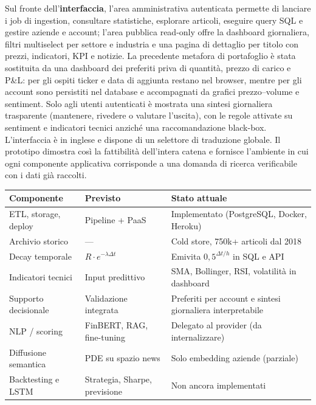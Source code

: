 \documentclass[a4paper,11pt]{article}
\begin{document}
Sul fronte dell'\textbf{interfaccia}, l'area amministrativa autenticata permette di lanciare i job di ingestion, consultare statistiche, esplorare articoli, eseguire query SQL e gestire aziende e account; l'area pubblica read-only offre la dashboard giornaliera, filtri multiselect per settore e industria e una pagina di dettaglio per titolo con prezzi, indicatori, KPI e notizie. La precedente metafora di portafoglio è stata sostituita da una dashboard dei preferiti priva di quantità, prezzo di carico e P\&L: per gli ospiti ticker e data di aggiunta restano nel browser, mentre per gli account sono persistiti nel database e accompagnati da grafici prezzo--volume e sentiment. Solo agli utenti autenticati è mostrata una sintesi giornaliera trasparente (mantenere, rivedere o valutare l'uscita), con le regole attivate su sentiment e indicatori tecnici anziché una raccomandazione black-box. L'interfaccia è in inglese e dispone di un selettore di traduzione globale. Il prototipo dimostra così la fattibilità dell'intera catena e fornisce l'ambiente in cui ogni componente applicativa corrisponde a una domanda di ricerca verificabile con i dati già raccolti.

\begin{table}[H]
\centering
\renewcommand{\arraystretch}{1.2}
\small
\begin{tabular}{|p{4.6cm}|p{3.4cm}|p{5.6cm}|}
\hline
\textbf{Componente} & \textbf{Previsto} & \textbf{Stato attuale} \\
\hline
ETL, storage, deploy & Pipeline + PaaS & Implementato (PostgreSQL, Docker, Heroku) \\
\hline
Archivio storico & --- & Cold store, 750k+ articoli dal 2018 \\
\hline
Decay temporale & $R\cdot e^{-\lambda\Delta t}$ & Emivita $0{,}5^{\Delta t/h}$ in SQL e API \\
\hline
Indicatori tecnici & Input predittivo & SMA, Bollinger, RSI, volatilità in dashboard \\
\hline
Supporto decisionale & Validazione integrata & Preferiti per account e sintesi giornaliera interpretabile \\
\hline
NLP / scoring & FinBERT, RAG, fine-tuning & Delegato al provider (da internalizzare) \\
\hline
Diffusione semantica & PDE su spazio news & Solo embedding aziende (parziale) \\
\hline
Backtesting e LSTM & Strategia, Sharpe, previsione & Non ancora implementati \\
\hline
\end{tabular}
\end{table}
\end{document}
